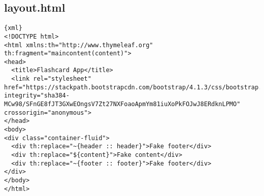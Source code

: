 \subsection*{layout.html}
\begin{lstlisting}[breaklines]{xml}
<!DOCTYPE html>
<html xmlns:th="http://www.thymeleaf.org" th:fragment="maincontent(content)">
<head>
  <title>Flashcard App</title>
  <link rel="stylesheet" href="https://stackpath.bootstrapcdn.com/bootstrap/4.1.3/css/bootstrap.min.css" integrity="sha384-MCw98/SFnGE8fJT3GXwEOngsV7Zt27NXFoaoApmYm81iuXoPkFOJwJ8ERdknLPMO" crossorigin="anonymous">
</head>
<body>
<div class="container-fluid">
  <div th:replace="~{header :: header}">Fake footer</div>
  <div th:replace="${content}">Fake content</div>
  <div th:replace="~{footer :: footer}">Fake footer</div>
</div>
</body>
</html>
\end{lstlisting}